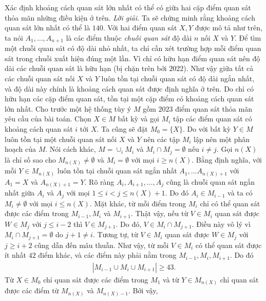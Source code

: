\begin{multicols}{2}
	\vskip 0.1cm
	Xác định khoảng cách quan sát lớn nhất có thể có giữa hai cặp điểm quan sát thỏa mãn những điều kiện ở trên.
	\vskip 0.1cm
	\textit{Lời giải.}
	Ta sẽ chứng minh rằng khoảng cách quan sát lớn nhất có thể là $140$.
	\vskip 0.1cm	
	Với hai điểm quan sát $X,Y$ được mô tả như trên, ta nói $A_1, \ldots, A_{n+1}$ là các điểm thuộc \textit{chuỗi quan sát} độ dài $n$ nối $X$ và $Y$. Để tìm một chuỗi quan sát có độ dài nhỏ nhất, ta chỉ cần xét trường hợp mỗi điểm quan sát trong chuỗi xuất hiện đúng một lần. Vì chỉ có hữu hạn điểm quan sát nên độ dài các chuỗi quan sát là hữu hạn (bị chặn trên bởi $2022$). Như vậy giữa tất cả các chuỗi quan sát nối $X$ và $Y$ luôn tồn tại chuỗi quan sát có độ dài ngắn nhất, và độ dài này chính là khoảng cách quan sát được định nghĩa ở trên. Do chỉ có hữu hạn các cặp điểm quan sát, tồn tại một cặp điểm có khoảng cách quan sát lớn nhất.
	\vskip 0.1cm	
	Cho trước một hệ thống tùy ý $M$ gồm $2023$ điểm quan sát thỏa mãn yêu cầu của bài toán. Chọn $X \in M$ bất kỳ và gọi $M_i$ tập các điểm quan sát có khoảng cách quan sát $i$ tới $X$. Ta cũng sẽ đặt $M_0 = \{X\}$. Do với bất kỳ $Y \in M$ luôn tồn tại một chuỗi quan sát nối $X$ và $Y$ nên các tập $M_i$ lập nên một phân hoạch của $M$. Nói cách khác, $M = \cup_{i}M_i$ và $M_i \cap M_j = \emptyset$ nếu $i\neq j$.
	\vskip 0.1cm
	Gọi $n(X)$ là chỉ số sao cho $M_{n(X)} \neq \emptyset$ và $M_i = \emptyset$ với mọi $i \ge n(X)$. Bằng định nghĩa, với mỗi $Y \in M_{n(X)}$ luôn tồn tại chuỗi quan sát ngắn nhất $A_1, \ldots A_{n(X) + 1}$ với $A_1 = X$ và $A_{n(X)+1} = Y$. Rõ ràng $A_i, A_{i+1}, \ldots, A_{j}$ cũng là chuỗi quan sát ngắn nhất giữa $A_i$ và $A_j$ với mọi $1 \le i <j \le n(X) + 1$. Do đó $A_i \in M_{i-1}$ và ta có $M_i \neq \emptyset$ với mọi $i \le n(X)$.
	\vskip 0.1cm	
	Mặt khác, từ mỗi điểm trong $M_i$ chỉ có thể quan sát được các điểm trong $M_{i-1}, M_i$ và $M_{i+1}$. Thật vậy, nếu từ $V \in M_i$ quan sát được $W \in M_j$ với $j \le i-2$ thì $V \in M_{j+1}$. Do đó, $V \in M_i \cap M_{j+1}$. Điều này vô lý vì $M_i \cap M_{j+1} = \emptyset$ do $j+1 \neq i$. Tương tự, từ $V \in M_i$ quan sát được $W \in M_j$ với $j \ge i+2$ cũng dẫn đến mâu thuẫn. Như vậy, từ mỗi $V \in M_i$ có thể quan sát được ít nhất $42$ điểm khác, và các điểm này phải nằm trong $M_{i-1}, M_i, M_{i+1}$. Do đó 
	\begin{align*}
		|M_{i-1} \cup M_i \cup M_{i+1}| \ge 43.
	\end{align*}
	Từ $X \in M_0$ chỉ quan sát được các điểm trong $M_1$ và từ $Y \in M_{n(X)}$ chỉ quan sát được các điểm từ $M_{n(X)}$ và $M_{n(X)-1}$. Bởi vậy,

\end{multicols}
